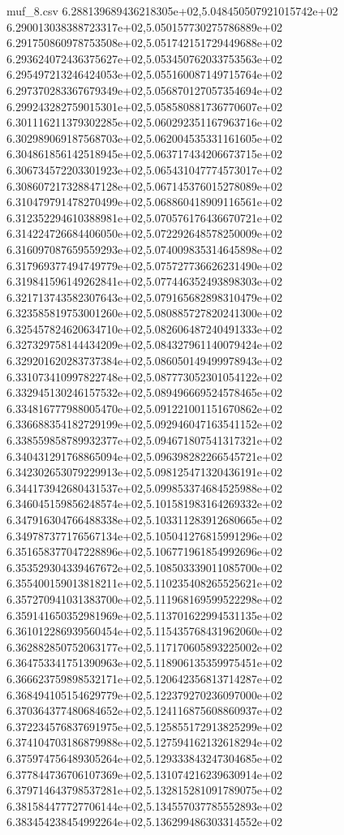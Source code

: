 \begin{filecontents*}{muf_8.csv}
6.288139689436218305e+02,5.048450507921015742e+02
6.290013038388723317e+02,5.050157730275786889e+02
6.291750860978753508e+02,5.051742151729449688e+02
6.293624072436375627e+02,5.053450762033753563e+02
6.295497213246424053e+02,5.055160087149715764e+02
6.297370283367679349e+02,5.056870127057354694e+02
6.299243282759015301e+02,5.058580881736770607e+02
6.301116211379302285e+02,5.060292351167963716e+02
6.302989069187568703e+02,5.062004535331161605e+02
6.304861856142518945e+02,5.063717434206673715e+02
6.306734572203301923e+02,5.065431047774573017e+02
6.308607217328847128e+02,5.067145376015278089e+02
6.310479791478270499e+02,5.068860418909116561e+02
6.312352294610388981e+02,5.070576176436670721e+02
6.314224726684406050e+02,5.072292648578250009e+02
6.316097087659559293e+02,5.074009835314645898e+02
6.317969377494749779e+02,5.075727736626231490e+02
6.319841596149262841e+02,5.077446352493898303e+02
6.321713743582307643e+02,5.079165682898310479e+02
6.323585819753001260e+02,5.080885727820241300e+02
6.325457824620634710e+02,5.082606487240491333e+02
6.327329758144434209e+02,5.084327961140079424e+02
6.329201620283737384e+02,5.086050149499978943e+02
6.331073410997822748e+02,5.087773052301054122e+02
6.332945130246157532e+02,5.089496669524578465e+02
6.334816777988005470e+02,5.091221001151670862e+02
6.336688354182729199e+02,5.092946047163541152e+02
6.338559858789932377e+02,5.094671807541317321e+02
6.340431291768865094e+02,5.096398282266545721e+02
6.342302653079229913e+02,5.098125471320436191e+02
6.344173942680431537e+02,5.099853374684525988e+02
6.346045159856248574e+02,5.101581983164269332e+02
6.347916304766488338e+02,5.103311283912680665e+02
6.349787377176567134e+02,5.105041276815991296e+02
6.351658377047228896e+02,5.106771961854992696e+02
6.353529304339467672e+02,5.108503339011085700e+02
6.355400159013818211e+02,5.110235408265525621e+02
6.357270941031383700e+02,5.111968169599522298e+02
6.359141650352981969e+02,5.113701622994531135e+02
6.361012286939560454e+02,5.115435768431962060e+02
6.362882850752063177e+02,5.117170605893225002e+02
6.364753341751390963e+02,5.118906135359975451e+02
6.366623759898532171e+02,5.120642356813714287e+02
6.368494105154629779e+02,5.122379270236097000e+02
6.370364377480684652e+02,5.124116875608860937e+02
6.372234576837691975e+02,5.125855172913825299e+02
6.374104703186879988e+02,5.127594162132618294e+02
6.375974756489305264e+02,5.129333843247304685e+02
6.377844736706107369e+02,5.131074216239630914e+02
6.379714643798537281e+02,5.132815281091789075e+02
6.381584477727706144e+02,5.134557037785552893e+02
6.383454238454992264e+02,5.136299486303314552e+02

\end{filecontents*}
